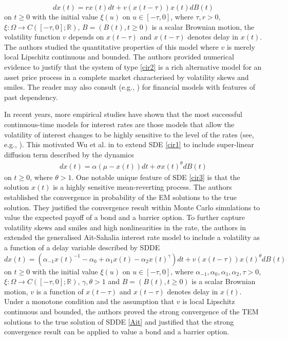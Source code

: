 \documentclass[11pt]{article}
\begin{document}
\begin{equation} \label{cir2}
dx(t)=rx(t)dt+v(x(t-\tau))x(t)dB(t)
\end{equation}
on $t\ge 0$ with the initial value $\xi(u)$ on $u\in[-\tau,0]$, where $\tau,r>0$, $\xi:\Omega\rightarrow C([-\tau,0];\mathbb{R})$, $B=(B(t),t\ge 0)$ is a scalar Brownian motion, the volatility function $v$ depends on $x(t-\tau)$ and $x(t-\tau)$ denotes delay in $x(t)$. The authors studied the quantitative properties of this model where  $v$ is merely local Lipschitz continuous and bounded. The authors provided numerical evidence to justify that the system of type \eqref{cir2} is a rich alternative model for an asset price process in a complete market characterised by volatility skews and smiles. The reader may also consult (e.g., \cite{Fuke1,Kind}) for financial models with features of past dependency. 
\par
In recent years, more empirical studies have shown that the most successful continuous-time models for interest rates are those models that allow the volatility of interest changes to be highly sensitive to the level of the rates (see, e.g., \cite{Chan,Nowman}). This motivated Wu et al. in  \cite{Fuke2} to extend SDE \eqref{cir1} to include super-linear diffusion term described by the dynamics
\begin{align}\label{cir3}
dx(t)=\alpha(\mu-x(t))dt+\sigma x(t)^{\theta}dB(t)
\end{align}
on $t\ge 0$, where $\theta>1$.  One notable unique feature of SDE \eqref{cir3} is that the solution $x(t)$ is a highly sensitive mean-reverting process. The authors established the convergence in probability of the EM  solutions to the true solution. They justified the convergence result within Monte Carlo simulations to value the expected payoff of a bond and a barrier option. To further capture volatility skews and smiles and high nonlinearities in the rate, the authors in \cite{emma} extended the generalised Ait-Sahalia interest rate model to include a volatility as a function of a delay variable described by  SDDE
\begin{equation}\label{Ait}
  dx(t)=(\alpha_{-1}x(t)^{-1}-\alpha_{0}+\alpha_{1}x(t)-\alpha_{2}x(t)^{\gamma})dt+v(x(t-\tau))x(t)^{\theta}dB(t)
\end{equation}
on $t\geq 0$ with the initial value $\xi(u)$ on $u\in[-\tau,0]$, where $\alpha_{-1},\alpha_{0},\alpha_{1},\alpha_{2}, \tau>0$, $\xi:\Omega\rightarrow C([-\tau,0];\mathbb{R})$, $\gamma,\theta>1$ and $B=(B(t),t\ge 0)$ is a scalar Brownian motion, $v$ is a function of $x(t-\tau)$ and $x(t-\tau)$ denotes delay in $x(t)$. Under a monotone condition and the assumption that $v$ is local Lipschitz continuous and bounded, the authors proved the strong convergence of the TEM solutions to the true solution of SDDE \eqref{Ait} and justified that the strong convergence result can be applied to value a bond and a barrier option.
\end{document}
